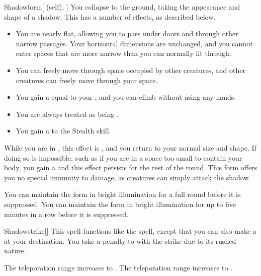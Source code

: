 \lowercase{\hypertarget{spell:Shadowform}{}}\label{spell:Shadowform}
\begin{attuneability}[Rank 4]{\hypertarget{spell:Shadowform}{Shadowform}}[ (self), ]
You collapse to the ground, taking the appearance and shape of a shadow.
This has a number of effects, as described below.
\begin{itemize}
\item You are nearly flat, allowing you to pass under doors and through other narrow passages.
Your horizontal dimensions are unchanged, and you cannot enter spaces that are more narrow than you can normally fit through.
\item You can freely move through space occupied by other creatures, and other creatures can freely move through your space.
\item You gain a  equal to your , and you can climb without using any hands.
\item You are always treated as being .
\item You gain a   to the Stealth skill.
\end{itemize}

While you are in , this effect is , and you return to your normal size and shape.
If doing so is impossible, such as if you are in a space too small to contain your body, you gain a  and this effect persists for the rest of the round.
This form offers you no special immunity to damage, as creatures can simply attack the shadow.

\rankline
{} You can maintain the form in bright illumination for a full round before it is suppressed.
 You can maintain the form in bright illumination for up to five minutes in a row before it is suppressed.

\end{attuneability}
\vspace{0.25em}



\lowercase{\hypertarget{spell:Shadowstrike}{}}\label{spell:Shadowstrike}
\begin{freeability}[Rank 4]{\hypertarget{spell:Shadowstrike}{Shadowstrike}}[]
This spell functions like the  spell, except that you can also make a  at your destination.
You take a  penalty to  with the strike due to its rushed nature.

\rankline
{} The teleporation range increases to \rnglong.
 The teleporation range increases to \rngext.

\end{freeability}
\vspace{0.25em}



